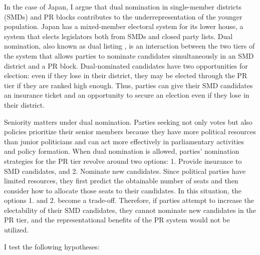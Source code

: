 \documentclass[a4paper, 12pt]{article}
\begin{document}
In the case of Japan, I argue that dual nomination in single-member districts (SMDs) and PR blocks contributes to the underrepresentation of the younger population. Japan has a mixed-member electoral system for its lower house, a system that elects legislators both from SMDs and closed party lists. Dual nomination, also known as dual listing \citep{reed2022}, is an interaction between the two tiers of the system that allows parties to nominate candidates simultaneously in an SMD district and a PR block. Dual-nominated candidates have two opportunities for election: even if they lose in their district, they may be elected through the PR tier if they are ranked high enough. Thus, parties can give their SMD candidates an insurance ticket and an opportunity to secure an election even if they lose in their district.

Seniority matters under dual nomination. Parties seeking not only votes but also policies prioritize their senior members because they have more political resources than junior politicians and can act more effectively in parliamentary activities and policy formation. When dual nomination is allowed, parties' nomination strategies for the PR tier revolve around two options: 1. Provide insurance to SMD candidates, and 2. Nominate new candidates. Since political parties have limited resources, they first predict the obtainable number of seats and then consider how to allocate those seats to their candidates. In this situation, the options 1. and 2. become a trade-off. Therefore, if parties attempt to increase the electability of their SMD candidates, they cannot nominate new candidates in the PR tier, and the representational benefits of the PR system would not be utilized. 

I test the following hypotheses: 
\end{document}
